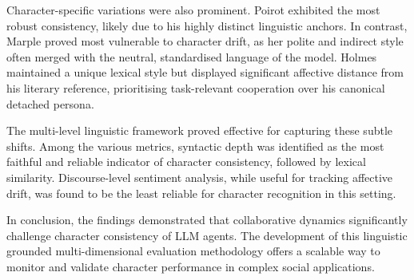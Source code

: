 \documentclass{article}
\begin{document}
Character-specific variations were also prominent. Poirot exhibited the most robust consistency, likely due to his highly distinct linguistic anchors. In contrast, Marple proved most vulnerable to character drift, as her polite and indirect style often merged with the neutral, standardised language of the model. Holmes maintained a unique lexical style but displayed significant affective distance from his literary reference, prioritising task-relevant cooperation over his canonical detached persona.

The multi-level linguistic framework proved effective for capturing these subtle shifts. Among the various metrics, syntactic depth was identified as the most faithful and reliable indicator of character consistency, followed by lexical similarity. Discourse-level sentiment analysis, while useful for tracking affective drift, was found to be the least reliable for character recognition in this setting.

In conclusion, the findings demonstrated that collaborative dynamics significantly challenge character consistency of LLM agents. The development of this linguistic grounded multi-dimensional evaluation methodology offers a scalable way to monitor and validate character performance in complex social applications.










\end{document}
